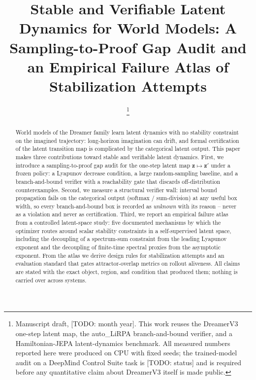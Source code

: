 \documentclass[journal]{IEEEtran}
\newcommand{\zdyn}{\boldsymbol{z}}
\begin{document}
\title{Stable and Verifiable Latent Dynamics for World Models: A Sampling-to-Proof
Gap Audit and an Empirical Failure Atlas of Stabilization Attempts}

\author{
  \thanks{Manuscript draft, [TODO: month year]. This work reuses the
  DreamerV3 one-step latent map, the auto\_LiRPA branch-and-bound verifier, and a
  Hamiltonian-JEPA latent-dynamics benchmark. All measured numbers reported
  here were produced on CPU with fixed seeds; the trained-model audit on a
  DeepMind Control Suite task is [TODO: status] and is required before any
  quantitative claim about DreamerV3 itself is made public.}
}


\maketitle

\begin{abstract}
World models of the Dreamer family learn latent dynamics with no stability
constraint on the imagined trajectory: long-horizon imagination can drift, and
formal certification of the latent transition map is complicated by the
categorical latent output. This paper makes three contributions toward stable
and verifiable latent dynamics. First, we introduce a sampling-to-proof gap
audit for the one-step latent map $\zdyn \mapsto \zdyn'$ under a frozen policy:
a Lyapunov decrease condition, a large random-sampling baseline, and a
branch-and-bound verifier with a reachability gate that discards
off-distribution counterexamples. Second, we measure a structural verifier
wall: interval bound propagation fails on the categorical output
(softmax / sum-division) at any useful box width, so every branch-and-bound
box is recorded as \emph{unknown} with its reason -- never as a violation and
never as certification. Third, we report an empirical failure atlas from a
controlled latent-space study: five documented mechanisms by which the
optimizer routes around scalar stability constraints in a self-supervised
latent space, including the decoupling of a spectrum-sum constraint from the
leading Lyapunov exponent and the decoupling of finite-time spectral proxies
from the asymptotic exponent. From the atlas we derive design rules for
stabilization attempts and an evaluation standard that gates attractor-overlap
metrics on rollout aliveness. All claims are stated with the exact object,
region, and condition that produced them; nothing is carried over across
systems.
\end{abstract}
\end{document}
